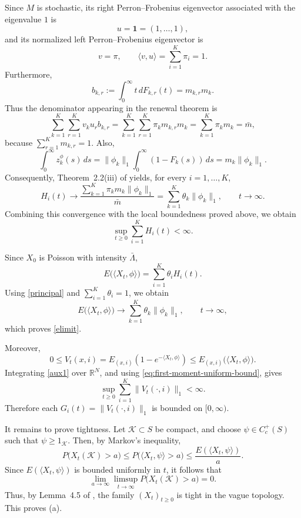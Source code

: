 \documentclass[reqno,final,11pt]{amsart}
\newcommand{\1}{\mathbbm{1}}
\renewcommand{\cite}{\citet}
\theoremstyle{plain}
\theoremstyle{definition}
\theoremstyle{remark}
\begin{document}
Since \(M\) is stochastic, its right Perron--Frobenius eigenvector associated
with the eigenvalue \(1\) is
\[
u=\mathbf 1=(1,\dots,1),
\]
and its normalized left Perron--Frobenius eigenvector is
\[
v=\pi,
\qquad
\langle v,u\rangle=\sum_{i=1}^K\pi_i=1.
\]
Furthermore,
\[
b_{k,r}
:=
\int_0^\infty t\,dF_{k,r}(t)
=
m_{k,r}m_k.
\]
Thus the denominator appearing in the renewal theorem is
\[
\sum_{k=1}^K\sum_{r=1}^K v_k u_r b_{k,r}
=
\sum_{k=1}^K\sum_{r=1}^K \pi_k m_{k,r}m_k
=
\sum_{k=1}^K\pi_km_k
=
\bar m,
\]
because \(\sum_{r=1}^K m_{k,r}=1\). Also,
\[
\int_0^\infty z_k^\phi(s)\,ds
=
\|\phi_k\|_1
\int_0^\infty (1-F_k(s))\,ds
=
m_k\|\phi_k\|_1.
\]
Consequently, Theorem~2.2\textup{(iii)} of \cite{Athreya2} yields, for every
\(i=1,\dots,K\),
\begin{equation}\label{principal}
H_i(t)
\longrightarrow
\frac{\sum_{k=1}^K\pi_km_k\|\phi_k\|_1}{\bar m}
=
\sum_{k=1}^K\theta_k\|\phi_k\|_1,
\qquad t\to\infty.
\end{equation}
Combining this convergence with the local boundedness proved above, we obtain
\begin{equation}\label{eq:first-moment-uniform-bound}
\sup_{t\ge0}\sum_{i=1}^K H_i(t)<\infty.
\end{equation}

Since \(X_0\) is Poisson with intensity \(\bar\Lambda\),
\[
E\big(\langle X_t,\phi\rangle\big)
=
\sum_{i=1}^K\theta_i H_i(t).
\]
Using \eqref{principal} and \(\sum_{i=1}^K\theta_i=1\), we obtain
\[
E\big(\langle X_t,\phi\rangle\big)
\longrightarrow
\sum_{k=1}^K\theta_k\|\phi_k\|_1,
\qquad t\to\infty,
\]
which proves \eqref{elimit}.

Moreover,
\begin{equation}\label{aux1}
0\le
V_t(x,i)
=
E_{(x,i)}
\left(
1-e^{-\langle X_t,\phi\rangle}
\right)
\le
E_{(x,i)}
\big(\langle X_t,\phi\rangle\big).
\end{equation}
Integrating \eqref{aux1} over \(\mathbb R^N\), and using
\eqref{eq:first-moment-uniform-bound}, gives
\begin{equation}\label{eq:V-uniform-L1-bound}
\sup_{t\ge0}\sum_{i=1}^K\|V_t(\cdot,i)\|_1<\infty .
\end{equation}
Therefore each \(G_i(t)=\|V_t(\cdot,i)\|_1\) is bounded on \([0,\infty)\).

It remains to prove tightness. Let \(\mathcal K\subset S\) be compact, and
choose \(\psi\in C_c^+(S)\) such that \(\psi\ge 1_{\mathcal K}\). Then, by
Markov's inequality,
\[
P\big(X_t(\mathcal K)>a\big)
\le
P\big(\langle X_t,\psi\rangle>a\big)
\le
\frac{E(\langle X_t,\psi\rangle)}{a}.
\]
Since \(E(\langle X_t,\psi\rangle)\) is bounded uniformly in \(t\), it follows
that
\[
\lim_{a\to\infty}\limsup_{t\to\infty}
P\big(X_t(\mathcal K)>a\big)=0.
\]
Thus, by Lemma~4.5 of \cite{Olav}, the family \((X_t)_{t\ge0}\) is tight in
the vague topology. This proves \textup{(a)}.
\end{document}

